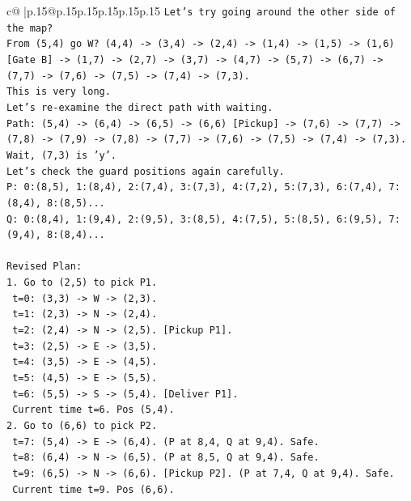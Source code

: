 \documentclass{article}
\begin{document}
{\begin{supertabular}{c@{$\;$}|p{.15\linewidth}@{}p{.15\linewidth}p{.15\linewidth}p{.15\linewidth}p{.15\linewidth}p{.15\linewidth}}
{{{\texttt{Let's try going around the other side of the map?} \\
\texttt{From (5,4) go W? (4,4) {-}> (3,4) {-}> (2,4) {-}> (1,4) {-}> (1,5) {-}> (1,6) {[}Gate B{]} {-}> (1,7) {-}> (2,7) {-}> (3,7) {-}> (4,7) {-}> (5,7) {-}> (6,7) {-}> (7,7) {-}> (7,6) {-}> (7,5) {-}> (7,4) {-}> (7,3).} \\
\texttt{This is very long.} \\
\texttt{Let's re{-}examine the direct path with waiting.} \\
\texttt{Path: (5,4) {-}> (6,4) {-}> (6,5) {-}> (6,6) {[}Pickup{]} {-}> (7,6) {-}> (7,7) {-}> (7,8) {-}> (7,9) {-}> (7,8) {-}> (7,7) {-}> (7,6) {-}> (7,5) {-}> (7,4) {-}> (7,3).} \\
\texttt{Wait, (7,3) is 'y'.} \\
\texttt{Let's check the guard positions again carefully.} \\
\texttt{P: 0:(8,5), 1:(8,4), 2:(7,4), 3:(7,3), 4:(7,2), 5:(7,3), 6:(7,4), 7:(8,4), 8:(8,5)...} \\
\texttt{Q: 0:(8,4), 1:(9,4), 2:(9,5), 3:(8,5), 4:(7,5), 5:(8,5), 6:(9,5), 7:(9,4), 8:(8,4)...} \\
\\ 
\texttt{Revised Plan:} \\
\texttt{1. Go to (2,5) to pick P1.} \\
\texttt{   t=0: (3,3) {-}> W {-}> (2,3).} \\
\texttt{   t=1: (2,3) {-}> N {-}> (2,4).} \\
\texttt{   t=2: (2,4) {-}> N {-}> (2,5). {[}Pickup P1{]}.} \\
\texttt{   t=3: (2,5) {-}> E {-}> (3,5).} \\
\texttt{   t=4: (3,5) {-}> E {-}> (4,5).} \\
\texttt{   t=5: (4,5) {-}> E {-}> (5,5).} \\
\texttt{   t=6: (5,5) {-}> S {-}> (5,4). {[}Deliver P1{]}.} \\
\texttt{   Current time t=6. Pos (5,4).} \\
\texttt{2. Go to (6,6) to pick P2.} \\
\texttt{   t=7: (5,4) {-}> E {-}> (6,4). (P at 8,4, Q at 9,4). Safe.} \\
\texttt{   t=8: (6,4) {-}> N {-}> (6,5). (P at 8,5, Q at 9,4). Safe.} \\
\texttt{   t=9: (6,5) {-}> N {-}> (6,6). {[}Pickup P2{]}. (P at 7,4, Q at 9,4). Safe.} \\
\texttt{   Current time t=9. Pos (6,6).} \\
}}}
\end{supertabular}}
\end{document}
